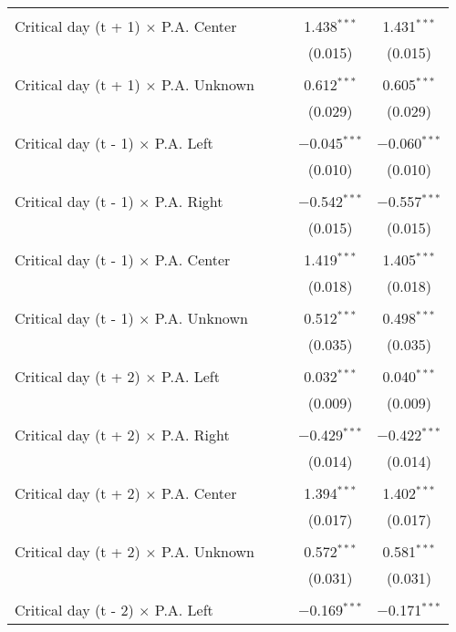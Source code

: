 \documentclass[
]{article}
\begin{document}
\begin{table}[!htbp]
{\begin{tabular}{@{\extracolsep{5pt}}lcccc}
  & & & & \\ 
 Critical day (t + 1) $\times$ P.A. Center &  &  & 1.438$^{***}$ & 1.431$^{***}$ \\ 
  &  &  & (0.015) & (0.015) \\ 
  & & & & \\ 
 Critical day (t + 1) $\times$ P.A. Unknown &  &  & 0.612$^{***}$ & 0.605$^{***}$ \\ 
  &  &  & (0.029) & (0.029) \\ 
  & & & & \\ 
 Critical day (t - 1) $\times$ P.A. Left &  &  & $-$0.045$^{***}$ & $-$0.060$^{***}$ \\ 
  &  &  & (0.010) & (0.010) \\ 
  & & & & \\ 
 Critical day (t - 1) $\times$ P.A. Right &  &  & $-$0.542$^{***}$ & $-$0.557$^{***}$ \\ 
  &  &  & (0.015) & (0.015) \\ 
  & & & & \\ 
 Critical day (t - 1) $\times$ P.A. Center &  &  & 1.419$^{***}$ & 1.405$^{***}$ \\ 
  &  &  & (0.018) & (0.018) \\ 
  & & & & \\ 
 Critical day (t - 1) $\times$ P.A. Unknown &  &  & 0.512$^{***}$ & 0.498$^{***}$ \\ 
  &  &  & (0.035) & (0.035) \\ 
  & & & & \\ 
 Critical day (t + 2) $\times$ P.A. Left &  &  & 0.032$^{***}$ & 0.040$^{***}$ \\ 
  &  &  & (0.009) & (0.009) \\ 
  & & & & \\ 
 Critical day (t + 2) $\times$ P.A. Right &  &  & $-$0.429$^{***}$ & $-$0.422$^{***}$ \\ 
  &  &  & (0.014) & (0.014) \\ 
  & & & & \\ 
 Critical day (t + 2) $\times$ P.A. Center &  &  & 1.394$^{***}$ & 1.402$^{***}$ \\ 
  &  &  & (0.017) & (0.017) \\ 
  & & & & \\ 
 Critical day (t + 2) $\times$ P.A. Unknown &  &  & 0.572$^{***}$ & 0.581$^{***}$ \\ 
  &  &  & (0.031) & (0.031) \\ 
  & & & & \\ 
 Critical day (t - 2) $\times$ P.A. Left &  &  & $-$0.169$^{***}$ & $-$0.171$^{***}$ \\ 

\end{tabular}}
\end{table}
\end{document}
